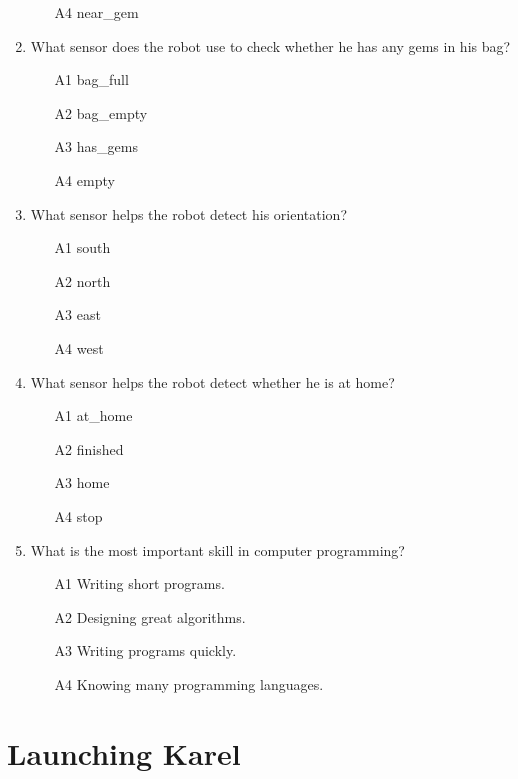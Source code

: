\begin{enumerate}
\begin{enumerate}
\item[A4] near\_gem
\end{enumerate}
\item What sensor does the robot use to check whether he has any gems in his bag?
\begin{enumerate}
\item[A1] bag\_full
\item[A2] bag\_empty
\item[A3] has\_gems
\item[A4] empty
\end{enumerate}
\item What sensor helps the robot detect his orientation?
\begin{enumerate}
\item[A1] south
\item[A2] north
\item[A3] east
\item[A4] west
\end{enumerate}
\item What sensor helps the robot detect whether he is at home?
\begin{enumerate}
\item[A1] at\_home
\item[A2] finished
\item[A3] home
\item[A4] stop
\end{enumerate}
\item What is the most important skill in computer programming?
\begin{enumerate}
\item[A1] Writing short programs.
\item[A2] Designing great algorithms.
\item[A3] Writing programs quickly.
\item[A4] Knowing many programming languages.
\end{enumerate}
\end{enumerate}

\section{Launching Karel}

